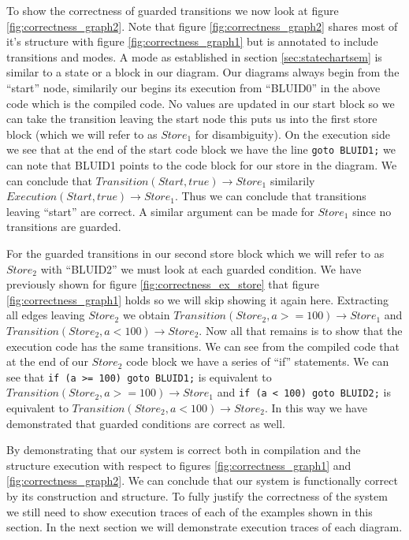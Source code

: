 To show the correctness of guarded transitions we now look at figure \ref{fig:correctness_graph2}.
Note that figure \ref{fig:correctness_graph2} shares most of it's structure with
figure \ref{fig:correctness_graph1} but is annotated to include transitions and modes.
A mode as established in section \ref{sec:statechartsem} is similar to a state or a block in our diagram.
Our diagrams always begin from the ``start'' node, similarily our begins its execution from ``BLUID0'' in
the above code which is the compiled code. No values are updated in our start block so we can take the
transition leaving the start node this puts us into the first store block (which we will refer
to as $Store_1$ for disambiguity). On the execution side we see that at the end of the start code
block we have the line \texttt{goto BLUID1;} we can note that BLUID1 points to the code block for
our store in the diagram. We can conclude that $Transition(Start, true) \rightarrow Store_1$ similarily
$Execution(Start, true) \rightarrow Store_1$. Thus we can conclude that transitions leaving ``start'' are
correct. A similar argument can be made for $Store_1$ since no transitions are guarded.

For the guarded transitions in our second store block which we will refer to as $Store_2$ with
``BLUID2'' we must look at each guarded condition. We have previously shown for
figure \ref{fig:correctness_ex_store} that figure \ref{fig:correctness_graph1} holds
so we will skip showing it again here. Extracting all edges leaving $Store_2$ we
obtain $Transition(Store_2, a >= 100) \rightarrow Store_1$ and $Transition(Store_2, a < 100) \rightarrow Store_2$.
Now all that remains is to show that the execution code has the same transitions.
We can see from the compiled code that at the end of our $Store_2$ code block we have
a series of ``if'' statements. We can see that \texttt{if (a >= 100) goto BLUID1;} is
equivalent to $Transition(Store_2, a >= 100) \rightarrow Store_1$ and \texttt{if (a < 100) goto BLUID2;} is
equivalent to $Transition(Store_2, a < 100) \rightarrow Store_2$. In this way we
have demonstrated that guarded conditions are correct as well.

By demonstrating that our system is correct both in compilation and the structure execution
with respect to figures \ref{fig:correctness_graph1} and \ref{fig:correctness_graph2}. We can
conclude that our system is functionally correct by its construction and structure. To fully
justify the correctness of the system we still need to show execution traces of each of the
examples shown in this section. In the next section we will demonstrate execution traces
of each diagram.


